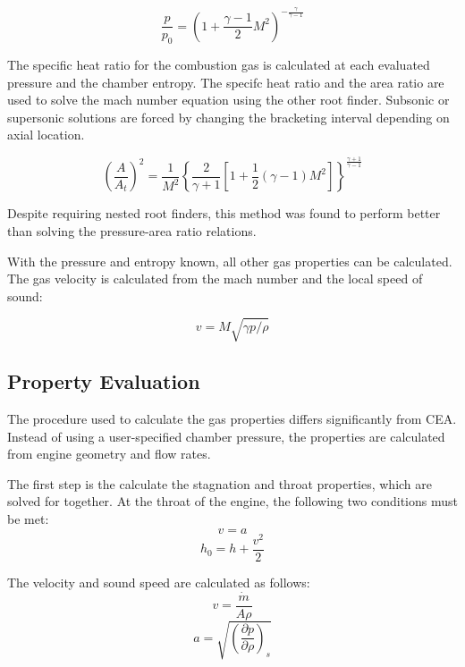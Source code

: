 \documentclass[11pt]{article}
\begin{document}
\begin{equation}
  \frac{p}{p_0} = (1 + \frac{\gamma - 1}{2} M^2) ^ {- \frac{\gamma}{\gamma - 1}}
\end{equation}

The specific heat ratio for the combustion gas is calculated at each evaluated pressure and the chamber entropy. The specifc heat ratio and the area ratio are used to solve the mach number equation using the other root finder. Subsonic or supersonic solutions are forced by changing the bracketing interval depending on axial location.

\begin{equation}
    \left( \frac{A}{A_t}\right)^2 = \frac{1}{M^2} \left\{ \frac{2}{\gamma + 1} \left[ 1 + \frac{1}{2} (\gamma - 1) M^2 \right] \right\}^{\frac{\gamma + 1}{\gamma - 1}}
\end{equation}

Despite requiring nested root finders, this method was found to perform better than solving the pressure-area ratio relations.

With the pressure and entropy known, all other gas properties can be calculated. The gas velocity is calculated from the mach number and the local speed of sound:

\begin{equation}
  v = M \sqrt{\gamma p / \rho}
\end{equation}

\subsection{Property Evaluation}


The procedure used to calculate the gas properties differs significantly from CEA. Instead of using a user-specified chamber pressure, the properties are calculated from engine geometry and flow rates.

The first step is the calculate the stagnation and throat properties, which are solved for together. At the throat of the engine, the following two conditions must be met:
\begin{equation}\label{cond:mach}
  v = a
\end{equation}%
\begin{equation}\label{cond:enthalpy}
  h_0 = h + \frac{v^2}{2}
\end{equation}

The velocity and sound speed are calculated as follows:
\begin{equation}
  v = \frac{\dot{m}}{A \rho}
\end{equation}%
\begin{equation}
  a = \sqrt{\left(\frac{\partial p}{\partial \rho}\right)_s}
\end{equation}
\end{document}
